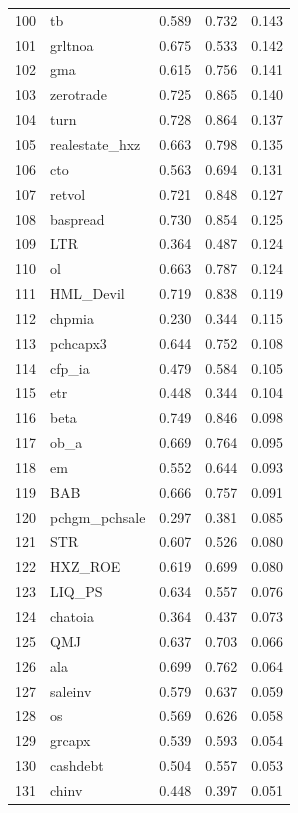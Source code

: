 \begin{footnotesize}
\begin{longtable}{rl|c|c|c}
		100 & tb & 0.589 & 0.732 & 0.143 \\ 
		101 & grltnoa & 0.675 & 0.533 & 0.142 \\ 
		102 & gma & 0.615 & 0.756 & 0.141 \\ 
		103 & zerotrade & 0.725 & 0.865 & 0.140 \\ 
		104 & turn & 0.728 & 0.864 & 0.137 \\ 
		105 & realestate\_hxz & 0.663 & 0.798 & 0.135 \\ 
		106 & cto & 0.563 & 0.694 & 0.131 \\ 
		107 & retvol & 0.721 & 0.848 & 0.127 \\ 
		108 & baspread & 0.730 & 0.854 & 0.125 \\ 
		109 & LTR & 0.364 & 0.487 & 0.124 \\ 
		110 & ol & 0.663 & 0.787 & 0.124 \\ 
		111 & HML\_Devil & 0.719 & 0.838 & 0.119 \\ 
		112 & chpmia & 0.230 & 0.344 & 0.115 \\ 
		113 & pchcapx3 & 0.644 & 0.752 & 0.108 \\ 
		114 & cfp\_ia & 0.479 & 0.584 & 0.105 \\ 
		115 & etr & 0.448 & 0.344 & 0.104 \\ 
		116 & beta & 0.749 & 0.846 & 0.098 \\ 
		117 & ob\_a & 0.669 & 0.764 & 0.095 \\ 
		118 & em & 0.552 & 0.644 & 0.093 \\ 
		119 & BAB & 0.666 & 0.757 & 0.091 \\ 
		120 & pchgm\_pchsale & 0.297 & 0.381 & 0.085 \\ 
		121 & STR & 0.607 & 0.526 & 0.080 \\ 
		122 & HXZ\_ROE & 0.619 & 0.699 & 0.080 \\ 
		123 & LIQ\_PS & 0.634 & 0.557 & 0.076 \\ 
		124 & chatoia & 0.364 & 0.437 & 0.073 \\ 
		125 & QMJ & 0.637 & 0.703 & 0.066 \\ 
		126 & ala & 0.699 & 0.762 & 0.064 \\ 
		127 & saleinv & 0.579 & 0.637 & 0.059 \\ 
		128 & os & 0.569 & 0.626 & 0.058 \\ 
		129 & grcapx & 0.539 & 0.593 & 0.054 \\ 
		130 & cashdebt & 0.504 & 0.557 & 0.053 \\ 
		131 & chinv & 0.448 & 0.397 & 0.051 \\ 

\end{longtable}
\end{footnotesize}

